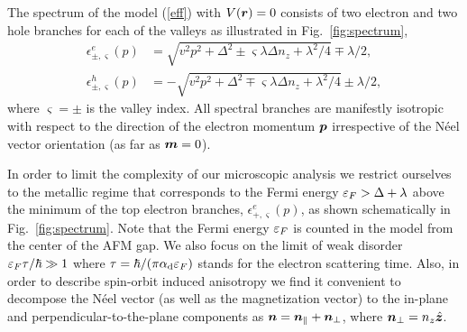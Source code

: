 The spectrum of the model (\ref{eff}) with $V(\boldsymbol{r})=0$ consists of two electron and two hole branches for each of the valleys as illustrated in Fig.~\ref{fig:spectrum},
\beml
\label{spectrum}
\begin{align}
\label{spectrume}
\epsilon^e_{\pm,\varsigma}(p)&=\sqrt{v^2p^2+\Delta^2\pm \varsigma\lambda\Delta n_z+\lambda^2/4} \mp \lambda/2,\\
\epsilon^h_{\pm,\varsigma}(p)&=-\sqrt{v^2p^2+\Delta^2\mp \varsigma\lambda\Delta n_z+\lambda^2/4} \pm \lambda/2,
\end{align}
\eml
where $\varsigma=\pm$ is the valley index. All spectral branches are manifestly isotropic with respect to the direction of the electron momentum $\boldsymbol{p}$ irrespective of the N\'eel vector orientation (as far as $\boldsymbol{m}=0$). 

In order to limit the complexity of our microscopic analysis we restrict ourselves to the metallic regime that corresponds to the Fermi energy $\varepsilon_F > \Delta+\lambda$ above the minimum of the top electron branches, $\epsilon^e_{+,\varsigma}(p)$, as shown schematically in Fig.~\ref{fig:spectrum}. Note that the Fermi energy $\varepsilon_F$ is counted in the model from the center of the AFM gap. 
We also focus on the limit of weak disorder $\varepsilon_F \tau/\hbar\gg 1$ where $\tau = \hbar/(\pi\alpha_\textrm{d}\varepsilon_F)$ stands for the electron scattering time. Also, in order to describe spin-orbit induced anisotropy we find it convenient to decompose the N\'eel vector (as well as the magnetization vector) to the in-plane and perpendicular-to-the-plane components as $\boldsymbol{n}= \boldsymbol{n}_\parallel+\boldsymbol{n}_\perp$, where $\boldsymbol{n}_\perp=n_z\hat{\boldsymbol{z}}$. 


